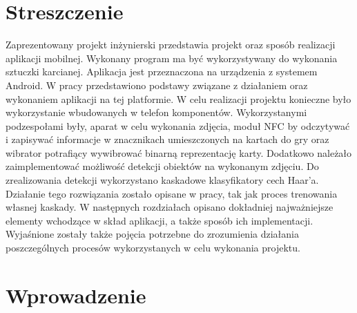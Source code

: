 \documentclass{article}
\let\stdsection\section
\renewcommand\section{\newpage\stdsection}
\numberwithin{equation}{section}
\begin{document}
\section*{Streszczenie}
Zaprezentowany projekt inżynierski przedstawia projekt oraz sposób realizacji aplikacji mobilnej. Wykonany program ma być wykorzystywany do wykonania sztuczki karcianej. Aplikacja jest przeznaczona na urządzenia z systemem Android. W pracy przedstawiono podstawy związane z działaniem oraz wykonaniem aplikacji na tej platformie. W celu realizacji projektu konieczne było wykorzystanie wbudowanych w telefon komponentów. Wykorzystanymi podzespołami były, aparat w celu wykonania zdjęcia, moduł NFC by odczytywać i zapisywać informacje w znacznikach umieszczonych na kartach do gry oraz wibrator potrafiący wywibrować binarną reprezentację karty. Dodatkowo należało zaimplementować możliwość detekcji obiektów na wykonanym zdjęciu. Do zrealizowania detekcji wykorzystano kaskadowe klasyfikatory cech Haar'a. Działanie tego rozwiązania zostało opisane w pracy, tak jak proces trenowania własnej kaskady. W następnych rozdziałach opisano dokładniej najważniejsze elementy wchodzące w skład aplikacji, a także sposób ich implementacji. Wyjaśnione zostały także pojęcia potrzebne do zrozumienia działania poszczególnych procesów wykorzystanych w celu wykonania projektu. 

\newpage

\tableofcontents

\section{Wprowadzenie}
\end{document}
